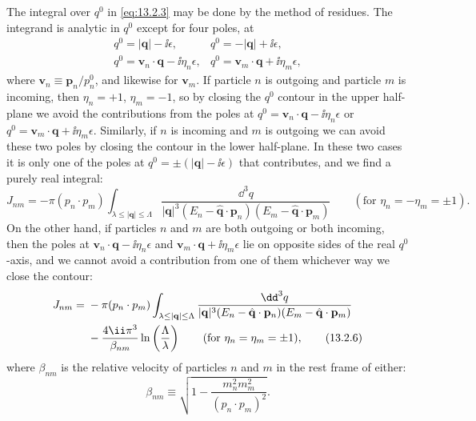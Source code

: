 The integral over $q^0$ in \eqref{eq:13.2.3} may be done by the method of residues.
The integrand is analytic in $q^0$ except for four poles, at
\[
  \begin{array}{ll}
    q^0=|\mathbf q|-\ii\epsilon, & q^0=-|\mathbf q|+\ii\epsilon,\\
    q^0=\mathbf v_n\cdot\mathbf q-\ii\eta_n\epsilon,
      & q^0=\mathbf v_m\cdot\mathbf q+\ii\eta_m\epsilon,
  \end{array}
\]
where $\mathbf v_n\equiv\mathbf p_n/p_n^0$, and likewise for $\mathbf v_m$. If particle $n$ is outgoing and
particle $m$ is incoming, then $\eta_n=+1$, $\eta_m=-1$, so by closing the $q^0$
contour in the upper half-plane we avoid the contributions from the poles
at $q^0=\mathbf v_n\cdot\mathbf q-\ii\eta_n\epsilon$ or $q^0=\mathbf v_m\cdot\mathbf q+\ii\eta_m\epsilon$. Similarly, if $n$ is incoming and $m$ is
outgoing we can avoid these two poles by closing the contour in the lower
half-plane. In these two cases it is only one of the poles at $q^0=\pm(|\mathbf q|-\ii\epsilon)$
that contributes, and we find a purely real integral:
\begin{equation}
  J_{nm}=-\pi(p_n\cdot p_m)
  \int_{\lambda\leq|\mathbf q|\leq\Lambda}
  \frac{\dd^3q}{|\mathbf q|^3
  (E_n-\hat{\mathbf q}\cdot\mathbf p_n)(E_m-\hat{\mathbf q}\cdot\mathbf p_m)}
  \qquad(\text{for }\eta_n=-\eta_m=\pm1).
  \tag{13.2.5}\label{eq:13.2.5}
\end{equation}
On the other hand, if particles $n$ and $m$ are both outgoing or both
incoming, then the poles at $\mathbf v_n\cdot\mathbf q-\ii\eta_n\epsilon$ and $\mathbf v_m\cdot\mathbf q+\ii\eta_m\epsilon$ lie on opposite
sides of the real $q^0$-axis, and we cannot avoid a contribution from one of
them whichever way we close the contour:
\begin{align}
  J_{nm}={}&-\pi(p_n\cdot p_m)
  \int_{\lambda\leq|\mathbf q|\leq\Lambda}
  \frac{\dd^3q}{|\mathbf q|^3
  (E_n-\hat{\mathbf q}\cdot\mathbf p_n)(E_m-\hat{\mathbf q}\cdot\mathbf p_m)}
  \notag\\
  &-\frac{4\ii\pi^3}{\beta_{nm}}\ln\left(\frac{\Lambda}{\lambda}\right)
  \qquad(\text{for }\eta_n=\eta_m=\pm1),
  \tag{13.2.6}\label{eq:13.2.6}
\end{align}
where $\beta_{nm}$ is the relative velocity of particles $n$ and $m$ in the rest frame of
either:
\begin{equation}
  \beta_{nm}\equiv\sqrt{1-\frac{m_n^2m_m^2}{(p_n\cdot p_m)^2}}.
  \tag{13.2.7}\label{eq:13.2.7}
\end{equation}
